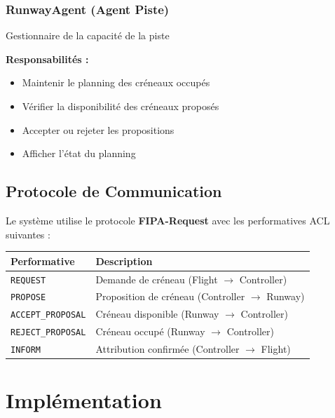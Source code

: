 \documentclass[12pt,a4paper]{article}
\begin{document}
\subsubsection{RunwayAgent (Agent Piste)}

\begin{tcolorbox}[colback=lightblue!15, colframe=primaryblue, title=\textbf{Rôle}]
Gestionnaire de la capacité de la piste
\end{tcolorbox}

\textbf{Responsabilités :}
\begin{itemize}[leftmargin=*]
    \item Maintenir le planning des créneaux occupés
    \item Vérifier la disponibilité des créneaux proposés
    \item Accepter ou rejeter les propositions
    \item Afficher l'état du planning
\end{itemize}

\subsection{Protocole de Communication}

Le système utilise le protocole \textbf{FIPA-Request} avec les performatives ACL suivantes :

\begin{center}
\begin{tabular}{|l|l|}
\hline
\rowcolor{lightblue!30}
\textbf{Performative} & \textbf{Description} \\
\hline
\texttt{REQUEST} & Demande de créneau (Flight $\rightarrow$ Controller) \\
\hline
\texttt{PROPOSE} & Proposition de créneau (Controller $\rightarrow$ Runway) \\
\hline
\texttt{ACCEPT\_PROPOSAL} & Créneau disponible (Runway $\rightarrow$ Controller) \\
\hline
\texttt{REJECT\_PROPOSAL} & Créneau occupé (Runway $\rightarrow$ Controller) \\
\hline
\texttt{INFORM} & Attribution confirmée (Controller $\rightarrow$ Flight) \\
\hline
\end{tabular}
\end{center}

\section{Implémentation}
\end{document}
